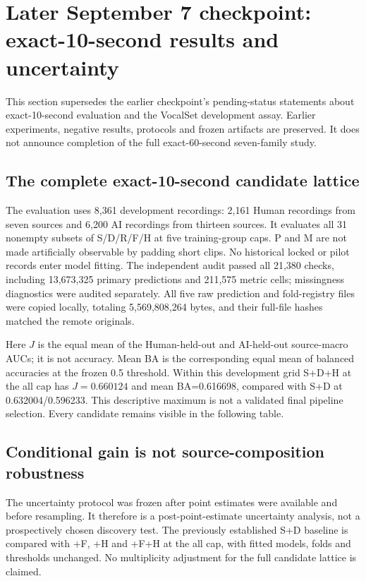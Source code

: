 \section{Later September 7 checkpoint: exact-10-second results and uncertainty}
\label{sec:later-phenomena-v2}

This section supersedes the earlier checkpoint's pending-status statements
about exact-10-second evaluation and the VocalSet development assay. Earlier
experiments, negative results, protocols and frozen artifacts are preserved.
It does not announce completion of the full exact-60-second seven-family study.

\subsection{The complete exact-10-second candidate lattice}
The evaluation uses 8,361 development recordings: 2,161 Human recordings from
seven sources and 6,200 AI recordings from thirteen sources. It evaluates all
31 nonempty subsets of S/D/R/F/H at five training-group caps. P and M are not
made artificially observable by padding short clips. No historical locked or
pilot records enter model fitting. The independent audit passed all 21,380
checks, including 13,673,325 primary predictions and 211,575 metric cells;
missingness diagnostics were audited separately. All five raw prediction and
fold-registry files were copied locally, totaling 5,569,808,264 bytes, and their
full-file hashes matched the remote originals.

Here $J$ is the equal mean of the Human-held-out and AI-held-out
source-macro AUCs; it is not accuracy. Mean BA is the corresponding equal mean
of balanced accuracies at the frozen 0.5 threshold. Within this development
grid S+D+H at the all cap has $J=0.660124$ and mean BA=0.616698, compared with
S+D at 0.632004/0.596233. This descriptive maximum is not a validated final
pipeline selection. Every candidate remains visible in the following table.



\subsection{Conditional gain is not source-composition robustness}
The uncertainty protocol was frozen after point estimates were available and
before resampling. It therefore is a post-point-estimate uncertainty analysis,
not a prospectively chosen discovery test. The previously established S+D
baseline is compared with +F, +H and +F+H at the all cap, with fitted models,
folds and thresholds unchanged. No multiplicity adjustment for the full
candidate lattice is claimed.

